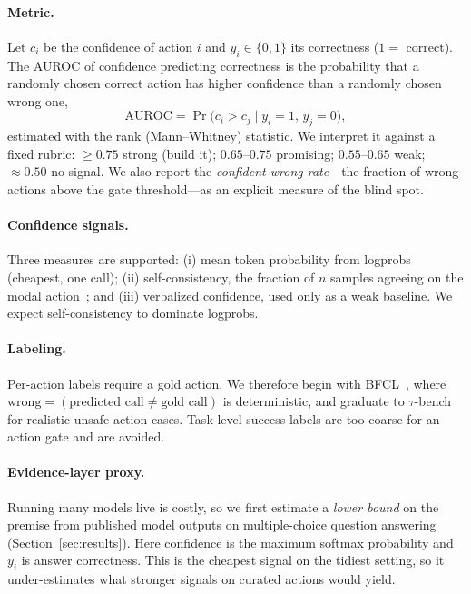 \documentclass[10pt,twocolumn]{article}
\begin{document}
\paragraph{Metric.}
Let $c_i$ be the confidence of action $i$ and $y_i\in\{0,1\}$ its correctness
($1=$ correct). The AUROC of confidence predicting correctness is the probability
that a randomly chosen correct action has higher confidence than a randomly chosen
wrong one,
\begin{equation}
\mathrm{AUROC} = \Pr\big(c_i > c_j \mid y_i=1,\, y_j=0\big),
\end{equation}
estimated with the rank (Mann--Whitney) statistic. We interpret it against a
fixed rubric: $\ge 0.75$ strong (build it); $0.65$--$0.75$ promising;
$0.55$--$0.65$ weak; ${\approx}0.50$ no signal. We also report the
\emph{confident-wrong rate}---the fraction of wrong actions above the gate
threshold---as an explicit measure of the blind spot.

\paragraph{Confidence signals.}
Three measures are supported: (i) mean token probability from logprobs (cheapest,
one call); (ii) self-consistency, the fraction of $n$ samples agreeing on the
modal action~\cite{wang2022self}; and (iii) verbalized confidence, used only as a
weak baseline. We expect self-consistency to dominate logprobs.

\paragraph{Labeling.}
Per-action labels require a gold action. We therefore begin with
BFCL~\cite{patil2023gorilla}, where $\text{wrong}=(\text{predicted call}\neq
\text{gold call})$ is deterministic, and graduate to
$\tau$-bench~\cite{yao2024taubench} for realistic unsafe-action cases.
Task-level success labels are too coarse for an action gate and are avoided.

\paragraph{Evidence-layer proxy.}
Running many models live is costly, so we first estimate a \emph{lower bound} on
the premise from published model outputs on multiple-choice question answering
(Section~\ref{sec:results}). Here confidence is the maximum softmax probability
and $y_i$ is answer correctness. This is the cheapest signal on the tidiest
setting, so it under-estimates what stronger signals on curated actions would
yield.
\end{document}

